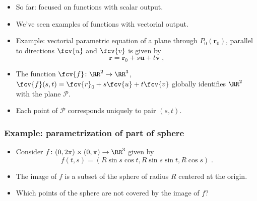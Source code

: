 \begin{frame}
\begin{itemize}
\item So far: focused on functions with scalar output. 
\item<2-> We've seen examples of functions with vectorial output.
\item<3-> Example: vectorial parametric equation of a plane through $P_0(\textbf{r}_0)$, parallel to directions $\fcv{u}$ and $\fcv{v}$ is given by 
\[\textbf{r} = \textbf{r}_0 + s \textbf{u} +
t \textbf{v}\; ,
\]
\item<4-> The function $\fcv{f} \colon \RR^2 \to \RR^3$, $\fcv{f}(s,t) = \fcv{r}_0 + s \fcv{u} + t \fcv{v}$ globally identifies
$\RR^2$ with the plane $\mathcal{P}$.
\item<5-> Each point of $\mathcal{P}$ corresponds uniquely to pair $(s,t)$.
\end{itemize}
\end{frame}

\begin{frame}
\frametitle{Example: parametrization of part of sphere}
\begin{itemize}
\item Consider $f \colon (0,2\pi) \times (0,\pi) \to \RR^3$ given by
\[f(t,s) = (R\sin{s}\cos{t}, R\sin{s}\sin{t},
R\cos{s}) \; .\]

\item<2-> The image of $f$ is a subset of the
sphere of radius $R$ centered at the origin.

\item<3-> Which points of the sphere are not covered
by the image of $f$?
\end{itemize}
\end{frame}